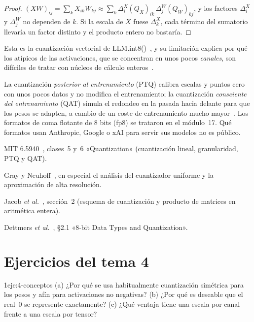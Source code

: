 \begin{proof}
$(XW)_{ij}=\sum_k X_{ik}W_{kj}\approx\sum_k\Delta^{X}_{i}(Q_X)_{ik}\,\Delta^{W}_{j}(Q_W)_{kj}$, y los factores $\Delta^{X}_{i}$ y $\Delta^{W}_{j}$ no dependen de $k$. Si la escala de $X$ fuese $\Delta^{X}_{k}$, cada término del sumatorio llevaría un factor distinto y el producto entero no bastaría.
\end{proof}

Esta es la cuantización vectorial de LLM.int8()~\cite[§3.1]{llmint8}, y su limitación explica por qué los atípicos de las activaciones, que se concentran en unos pocos \emph{canales}, son difíciles de tratar con núcleos de cálculo enteros~\cite[§3]{smoothquant}.

\begin{observacion}
La cuantización \emph{posterior al entrenamiento} (PTQ) calibra escalas y puntos cero con unos pocos datos y no modifica el entrenamiento; la cuantización \emph{consciente del entrenamiento} (QAT) simula el redondeo en la pasada hacia delante para que los pesos se adapten, a cambio de un coste de entrenamiento mucho mayor~\cite{cs336,mit65940}. Los formatos de coma flotante de 8 bits (fp8) se trataron en el módulo~17. Qué formatos usan Anthropic, Google o xAI para servir sus modelos no es público.
\end{observacion}

\begin{lecturas}
\item MIT 6.5940~\cite{mit65940}, clases~5 y~6 «Quantization» (cuantización lineal, granularidad, PTQ y QAT).
\item Gray y Neuhoff~\cite{grayneuhoff}, en especial el análisis del cuantizador uniforme y la aproximación de alta resolución.
\item Jacob \emph{et al.}~\cite{jacob}, sección~2 (esquema de cuantización y producto de matrices en aritmética entera).
\item Dettmers \emph{et al.}~\cite{llmint8}, §2.1 «8-bit Data Types and Quantization».
\end{lecturas}

\section*{Ejercicios del tema 4}

\begin{ejercicio}{1}{eje:4-conceptos}
(a) ¿Por qué se usa habitualmente cuantización simétrica para los pesos y afín para activaciones no negativas? (b) ¿Por qué es deseable que el real~$0$ se represente exactamente? (c) ¿Qué ventaja tiene una escala por canal frente a una escala por tensor?
\end{ejercicio}

